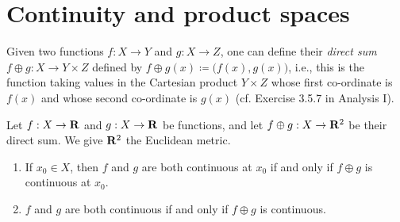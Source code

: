 \section{Continuity and product spaces}\label{sec 2.2}

\begin{note}
    Given two functions \(f : X \to Y\) and \(g : X \to Z\), one can define their \emph{direct sum} \(f \oplus g : X \to Y \times Z\) defined by \(f \oplus g(x) \coloneqq \big(f(x), g(x)\big)\), i.e., this is the function taking values in the Cartesian product \(Y \times Z\) whose first co-ordinate is \(f(x)\) and whose second co-ordinate is \(g(x)\)
    (cf. Exercise 3.5.7 in Analysis I).
\end{note}

\begin{lemma}\label{2.2.1}
    Let \(f : X \to \mathbf{R}\) and \(g : X \to \mathbf{R}\) be functions, and let \(f \oplus g : X \to \mathbf{R}^2\) be their direct sum.
    We give \(\mathbf{R}^2\) the Euclidean metric.
    \begin{enumerate}
        \item If \(x_0 \in X\), then \(f\) and \(g\) are both continuous at \(x_0\) if and only if \(f \oplus g\) is continuous at \(x_0\).
        \item \(f\) and \(g\) are both continuous if and only if \(f \oplus g\) is continuous.
    \end{enumerate}
\end{lemma}

